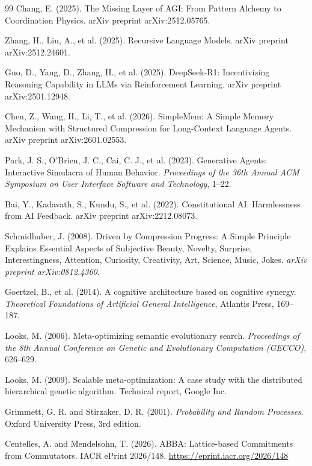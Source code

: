 \documentclass[11pt,a4paper]{article}
\begin{document}
\begin{thebibliography}{99}
Chang, E. (2025).
The Missing Layer of AGI: From Pattern Alchemy to Coordination Physics.
arXiv preprint arXiv:2512.05765.

Zhang, H., Liu, A., et al. (2025).
Recursive Language Models.
arXiv preprint arXiv:2512.24601.

Guo, D., Yang, D., Zhang, H., et al. (2025).
DeepSeek-R1: Incentivizing Reasoning Capability in LLMs via Reinforcement Learning.
arXiv preprint arXiv:2501.12948.

Chen, Z., Wang, H., Li, T., et al. (2026).
SimpleMem: A Simple Memory Mechanism with Structured Compression for Long-Context Language Agents.
arXiv preprint arXiv:2601.02553.

Park, J. S., O'Brien, J. C., Cai, C. J., et al. (2023).
Generative Agents: Interactive Simulacra of Human Behavior.
\textit{Proceedings of the 36th Annual ACM Symposium on User Interface Software and Technology}, 1--22.

Bai, Y., Kadavath, S., Kundu, S., et al. (2022).
Constitutional AI: Harmlessness from AI Feedback.
arXiv preprint arXiv:2212.08073.

Schmidhuber, J. (2008).
Driven by Compression Progress: A Simple Principle Explains Essential Aspects of Subjective Beauty, Novelty, Surprise, Interestingness, Attention, Curiosity, Creativity, Art, Science, Music, Jokes.
\textit{arXiv preprint arXiv:0812.4360}.

Goertzel, B., et al. (2014).
A cognitive architecture based on cognitive synergy.
\textit{Theoretical Foundations of Artificial General Intelligence}, Atlantis Press, 169--187.

Looks, M. (2006).
Meta-optimizing semantic evolutionary search.
\textit{Proceedings of the 8th Annual Conference on Genetic and Evolutionary Computation (GECCO)}, 626--629.

Looks, M. (2009).
Scalable meta-optimization: A case study with the distributed hierarchical genetic algorithm.
Technical report, Google Inc.

Grimmett, G. R. and Stirzaker, D. R. (2001).
\textit{Probability and Random Processes}.
Oxford University Press, 3rd edition.

Centelles, A. and Mendelsohn, T. (2026).
ABBA: Lattice-based Commitments from Commutators.
IACR ePrint 2026/148.
\url{https://eprint.iacr.org/2026/148}

\fussy
\end{thebibliography}
\end{document}

